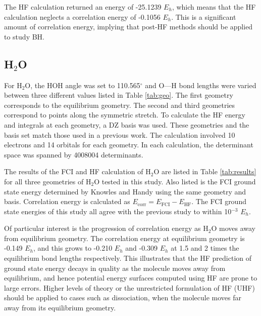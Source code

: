 \documentclass[final,3p,times,twocolumn]{elsarticle}
\begin{document}

The HF calculation returned an energy of -25.1239 $E_h$, which means that the HF calculation neglects a correlation energy of -0.1056 $E_h$. This is a significant amount of correlation energy, implying that post-HF methods should be applied to study BH.


\subsection{H$_2$O} \label{sec:h2oresults}

For H$_2$O, the HOH angle was set to 110.565$^\circ$ and O---H bond lengths were varied between three different values listed in Table \ref{tab:geo}. The first geometry corresponds to the equilibrium geometry. The second and third geometries correspond to points along the symmetric stretch. To calculate the HF energy and integrals at each geometry, a DZ basis was used. These geometries and the basis set match those used in a previous work.\cite{handy-1983} The calculation involved 10 electrons and 14 orbitals for each geometry. In each calculation, the determinant space was spanned by 4008004 determinants.

The results of the FCI and HF calculation of H$_2$O are listed in Table \ref{tab:results} for all three geometries of H$_2$O tested in this study. Also listed is the FCI ground state energy determined by Knowles and Handy using the same geometry and basis.\cite{handy-1983} Correlation energy is calculated as $E_{\text{corr}} = E_{\text{FCI}} - E_{\text{HF}}$. The FCI ground state energies of this study all agree with the previous study to within 10$^{-3}$ $E_h$. %

Of particular interest is the progression of correlation energy as H$_2$O moves away from equilibrium geometry. The correlation energy at equilibrium geometry is -0.149 $E_h$, and this grows to -0.210 $E_h$ and -0.309 $E_h$ at 1.5 and 2 times the equilibrium bond lengths respectively. This illustrates that the HF prediction of ground state energy decays in quality as the molecule moves away from equilibrium, and hence potential energy surfaces computed using HF are prone to large errors. Higher levels of theory or the unrestricted formulation of HF (UHF) should be applied to cases such as dissociation, when the molecule moves far away from its equilibrium geometry.
\end{document}
